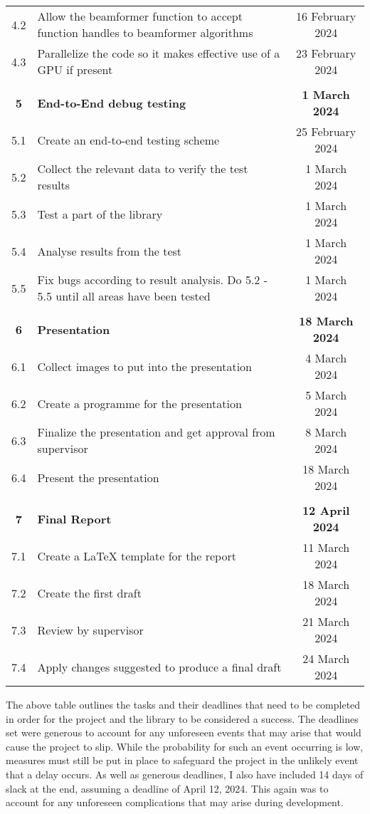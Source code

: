 \begin{tabularx}{\textwidth}{@{}|c|X|C|@{}}
    4.2 & Allow the beamformer function to accept function handles to beamformer algorithms & 16 February 2024 \\
    4.3 & Parallelize the code so it makes effective use of a GPU if present & 23 February 2024 \\
    \hline
     \\
    \hline
    \textbf{5} & \textbf{End-to-End debug testing} & \textbf{1 March 2024} \\
    5.1 & Create an end-to-end testing scheme & 25 February 2024 \\
    5.2 & Collect the relevant data to verify the test results & 1 March 2024 \\
    5.3 & Test a part of the library & 1 March 2024 \\
    5.4 & Analyse results from the test & 1 March 2024 \\
    5.5 & Fix bugs according to result analysis. Do 5.2 - 5.5 until all areas have been tested & 1 March 2024 \\
    \hline
     \\
    \hline
    \textbf{6} & \textbf{Presentation} & \textbf{18 March 2024} \\
    6.1 & Collect images to put into the presentation & 4 March 2024 \\
    6.2 & Create a programme for the presentation & 5 March 2024 \\
    6.3 & Finalize the presentation and get approval from supervisor & 8 March 2024 \\
    6.4 & Present the presentation & 18 March 2024 \\
    \hline
     \\
    \hline
    \textbf{7} & \textbf{Final Report} & \textbf{12 April 2024} \\
    7.1 & Create a LaTeX template for the report & 11 March 2024 \\
    7.2 & Create the first draft & 18 March 2024 \\
    7.3 & Review by supervisor & 21 March 2024 \\
    7.4 & Apply changes suggested to produce a final draft & 24 March 2024 \\
    \hline
\end{tabularx}

\bigskip
\noindent
The above table outlines the tasks and their deadlines that need to be completed in order for the
project and the library to be considered a success. The deadlines set were generous to account for any
unforeseen events that may arise that would cause the project to slip. While the probability for such
an event occurring is low, measures must still be put in place to safeguard the project in the unlikely
event that a delay occurs. As well as generous deadlines, I also have included 14 days of slack at the
end, assuming a deadline of April 12, 2024. This again was to account for any unforeseen
complications that may arise during development.